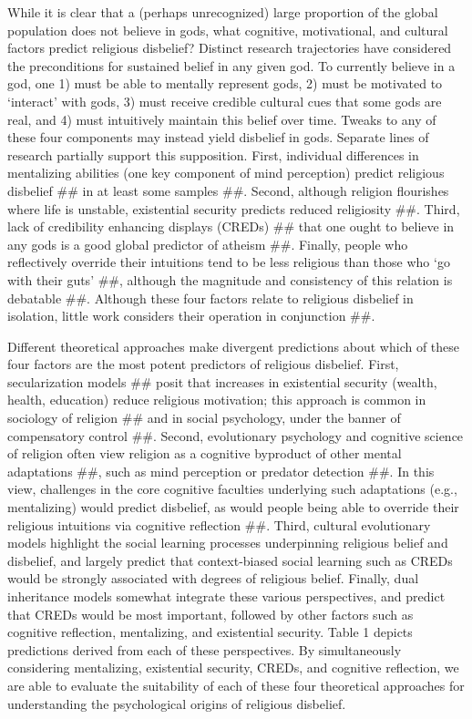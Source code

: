 \documentclass[]{article}
\begin{document}
While it is clear that a (perhaps unrecognized) large proportion of the
global population does not believe in gods, what cognitive,
motivational, and cultural factors predict religious disbelief? Distinct
research trajectories have considered the preconditions for sustained
belief in any given god. To currently believe in a god, one 1) must be
able to mentally represent gods, 2) must be motivated to `interact' with
gods, 3) must receive credible cultural cues that some gods are real,
and 4) must intuitively maintain this belief over time. Tweaks to any of
these four components may instead yield disbelief in gods. Separate
lines of research partially support this supposition. First, individual
differences in mentalizing abilities (one key component of mind
perception) predict religious disbelief \#\# in at least some samples
\#\#. Second, although religion flourishes where life is unstable,
existential security predicts reduced religiosity \#\#. Third, lack of
credibility enhancing displays (CREDs) \#\# that one ought to believe in
any gods is a good global predictor of atheism \#\#. Finally, people who
reflectively override their intuitions tend to be less religious than
those who `go with their guts' \#\#, although the magnitude and
consistency of this relation is debatable \#\#. Although these four
factors relate to religious disbelief in isolation, little work
considers their operation in conjunction \#\#.

Different theoretical approaches make divergent predictions about which
of these four factors are the most potent predictors of religious
disbelief. First, secularization models \#\# posit that increases in
existential security (wealth, health, education) reduce religious
motivation; this approach is common in sociology of religion \#\# and in
social psychology, under the banner of compensatory control \#\#.
Second, evolutionary psychology and cognitive science of religion often
view religion as a cognitive byproduct of other mental adaptations \#\#,
such as mind perception or predator detection \#\#. In this view,
challenges in the core cognitive faculties underlying such adaptations
(e.g., mentalizing) would predict disbelief, as would people being able
to override their religious intuitions via cognitive reflection \#\#.
Third, cultural evolutionary models highlight the social learning
processes underpinning religious belief and disbelief, and largely
predict that context-biased social learning such as CREDs would be
strongly associated with degrees of religious belief. Finally, dual
inheritance models somewhat integrate these various perspectives, and
predict that CREDs would be most important, followed by other factors
such as cognitive reflection, mentalizing, and existential security.
Table 1 depicts predictions derived from each of these perspectives. By
simultaneously considering mentalizing, existential security, CREDs, and
cognitive reflection, we are able to evaluate the suitability of each of
these four theoretical approaches for understanding the psychological
origins of religious disbelief.
\end{document}
